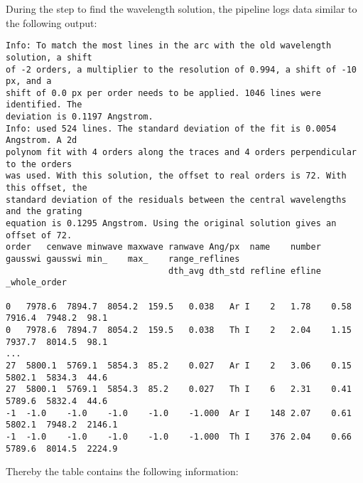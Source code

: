 \documentclass[10pt,a4paper]{article}
\begin{document}
During the step to find the wavelength solution, the pipeline logs data similar to the following output:
\begin{lstlisting}[style=base, basicstyle=\tiny]
Info: To match the most lines in the arc with the old wavelength solution, a shift
of -2 orders, a multiplier to the resolution of 0.994, a shift of -10 px, and a
shift of 0.0 px per order needs to be applied. 1046 lines were identified. The
deviation is 0.1197 Angstrom.
Info: used 524 lines. The standard deviation of the fit is 0.0054 Angstrom. A 2d
polynom fit with 4 orders along the traces and 4 orders perpendicular to the orders
was used. With this solution, the offset to real orders is 72. With this offset, the
standard deviation of the residuals between the central wavelengths and the grating
equation is 0.1295 Angstrom. Using the original solution gives an offset of 72.
order	cenwave	minwave	maxwave	ranwave	Ang/px	name	number	gausswi	gausswi	min_	max_	range_reflines
								dth_avg	dth_std	refline	efline	_whole_order

0	7978.6	7894.7	8054.2	159.5	0.038	Ar I  	2	1.78	0.58	7916.4	7948.2	98.1
0	7978.6	7894.7	8054.2	159.5	0.038	Th I  	2	2.04	1.15	7937.7	8014.5	98.1
...
27	5800.1	5769.1	5854.3	85.2	0.027	Ar I  	2	3.06	0.15	5802.1	5834.3	44.6
27	5800.1	5769.1	5854.3	85.2	0.027	Th I  	6	2.31	0.41	5789.6	5832.4	44.6
-1	-1.0	-1.0	-1.0	-1.0	-1.000	Ar I  	148	2.07	0.61	5802.1	7948.2	2146.1
-1	-1.0	-1.0	-1.0	-1.0	-1.000	Th I  	376	2.04	0.66	5789.6	8014.5	2224.9
\end{lstlisting} 
Thereby the table contains the following information:
\end{document}
